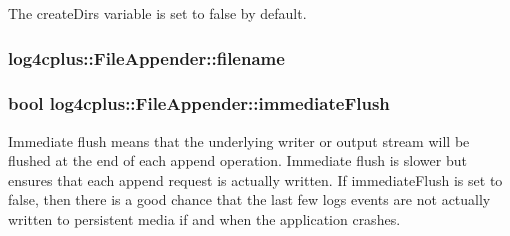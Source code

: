 The {\ttfamily create\-Dirs} variable is set to {\ttfamily false} by default. \hypertarget{classlog4cplus_1_1FileAppender_aa04b4a30301c69d784248eccbac2f864}{
\subsubsection[{filename}]{ log4cplus\-::\-File\-Appender\-::filename\hspace{0.3cm}{\ttfamily [protected]}}}\label{classlog4cplus_1_1FileAppender_aa04b4a30301c69d784248eccbac2f864}
\hypertarget{classlog4cplus_1_1FileAppender_a89f7c6ae8f630cc2190a376fcc7ca2cc}{
\subsubsection[{immediate\-Flush}]{\setlength{\rightskip}{0pt plus 5cm}bool log4cplus\-::\-File\-Appender\-::immediate\-Flush\hspace{0.3cm}{\ttfamily [protected]}}}\label{classlog4cplus_1_1FileAppender_a89f7c6ae8f630cc2190a376fcc7ca2cc}
Immediate flush means that the underlying writer or output stream will be flushed at the end of each append operation. Immediate flush is slower but ensures that each append request is actually written. If {\ttfamily immediate\-Flush} is set to {\ttfamily false}, then there is a good chance that the last few logs events are not actually written to persistent media if and when the application crashes.

